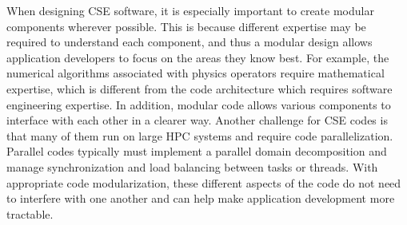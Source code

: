 
When designing CSE software, it is especially important to create
modular components wherever possible.  This is because different expertise may be required to understand
each component, and thus a modular design allows application
developers to focus on the areas they know best. For example, the
numerical algorithms associated with physics operators require mathematical expertise, which is
different from the code architecture which requires software
engineering expertise. In addition, modular code allows various
components to interface with each other in a clearer way.  Another
challenge for CSE codes is that many of them run on large HPC systems and require code parallelization.  Parallel codes typically must implement a parallel domain decomposition and manage synchronization and load balancing between tasks or threads.  With appropriate code modularization, these different aspects of the code do not need to interfere with one another and can help make application development more tractable.


